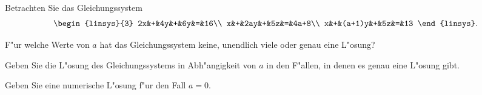Betrachten Sie das Gleichungssystem
\[
\begin{linsys}{3}
2x&+&4y&+&6y&=&16\\
x&+&2ay&+&5z&=&4a+8\\
x&+&(a+1)y&+&5z&=&13
\end{linsys}.
\]
\begin{teilaufgaben}
\item
F"ur welche Werte von $a$ hat das Gleichungssystem
keine, unendlich viele oder genau eine L"osung?
\item
Geben Sie die L"osung des Gleichungssystems in Abh"angigkeit von $a$
in den F"allen, in denen es genau eine L"osung gibt.
\item
Geben Sie eine numerische L"osung f"ur den Fall $a=0$.
\end{teilaufgaben}

